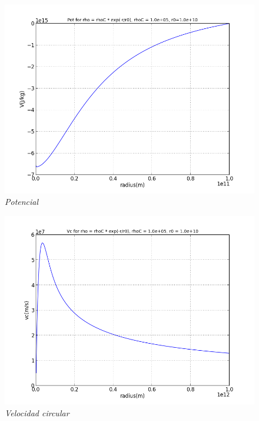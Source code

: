 \documentclass[12pt]{book}
\begin{document}
\begin{description}
\begin{figure}[!ht]
 \centering
 \includegraphics[scale=0.4]{potAn.png}
 \caption{\emph{Potencial}}
\end{figure}

\begin{figure}[!ht]
 \centering
 \includegraphics[scale=0.4]{vcAn.png}
 \caption{\emph{Velocidad circular}}
\end{figure}


\end{description}
\end{document}
